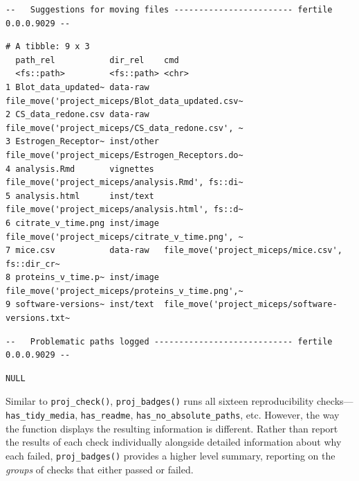 \documentclass[12pt,twoside]{reedthesis}
\begin{document}
\begin{verbatim}
--   Suggestions for moving files ------------------------ fertile 0.0.0.9029 --
\end{verbatim}
\begin{verbatim}
# A tibble: 9 x 3
  path_rel           dir_rel    cmd                                             
  <fs::path>         <fs::path> <chr>                                           
1 Blot_data_updated~ data-raw   file_move('project_miceps/Blot_data_updated.csv~
2 CS_data_redone.csv data-raw   file_move('project_miceps/CS_data_redone.csv', ~
3 Estrogen_Receptor~ inst/other file_move('project_miceps/Estrogen_Receptors.do~
4 analysis.Rmd       vignettes  file_move('project_miceps/analysis.Rmd', fs::di~
5 analysis.html      inst/text  file_move('project_miceps/analysis.html', fs::d~
6 citrate_v_time.png inst/image file_move('project_miceps/citrate_v_time.png', ~
7 mice.csv           data-raw   file_move('project_miceps/mice.csv', fs::dir_cr~
8 proteins_v_time.p~ inst/image file_move('project_miceps/proteins_v_time.png',~
9 software-versions~ inst/text  file_move('project_miceps/software-versions.txt~
\end{verbatim}
\begin{verbatim}
--   Problematic paths logged ---------------------------- fertile 0.0.0.9029 --
\end{verbatim}
\begin{verbatim}
NULL
\end{verbatim}
Similar to \texttt{proj\_check()}, \texttt{proj\_badges()} runs all
sixteen reproducibility checks---\texttt{has\_tidy\_media},
\texttt{has\_readme}, \texttt{has\_no\_absolute\_paths}, etc. However,
the way the function displays the resulting information is different.
Rather than report the results of each check individually alongside
detailed information about why each failed, \texttt{proj\_badges()}
provides a higher level summary, reporting on the \emph{groups} of
checks that either passed or failed.
\end{document}
